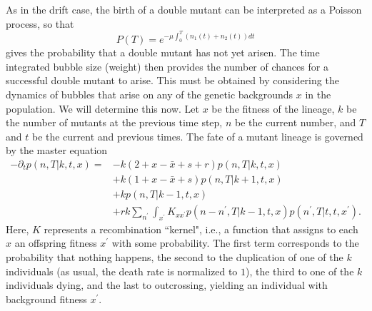 \documentclass[10pt]{revtex4}
\begin{document}
As in the drift case, the birth of a double mutant can be interpreted as a Poisson process, so that
\begin{equation}
P(T) = e^{-\mu \int_0^T (n_1(t) + n_2(t)) dt}
\end{equation}
gives the probability that a double mutant has not yet arisen.
The time integrated bubble size (weight) then provides the number of chances for a successful double mutant to arise.
This must be obtained by considering the dynamics of bubbles that arise on any of the genetic backgrounds $x$ in the population.
We will determine this now.
Let $x$ be the fitness of the lineage, $k$ be the number of mutants at the previous time step, $n$ be the current number, and $T$ and $t$ be the current and previous times.
The fate of a mutant lineage is governed by the master equation
\begin{align*}
-\partial_t p(n,T|k,t,x) = &-k(2+x-\bar{x}+s+r)p(n,T|k,t,x) \\
& + k(1+x-\bar{x}+s)p(n,T|k+1,t,x) \\
& +kp(n,T|k-1,t,x) \\
&+rk\sum_{n^\prime} \int_{x^\prime} K_{x x^\prime} p(n-n^\prime , T|k-1, t, x) p(n^\prime,T|t,t,x^\prime).
\end{align*}
Here, $K$ represents a recombination ``kernel", i.e., a function that assigns to each $x$ an offspring fitness $x^\prime$ with some probability.
The first term corresponds to the probability that nothing happens, the second to the duplication of one of the $k$ individuals (as usual, the death rate is normalized to $1$), the third to one of the $k$ individuals dying, and the last to outcrossing, yielding an individual with background fitness $x^\prime$.
\end{document}
